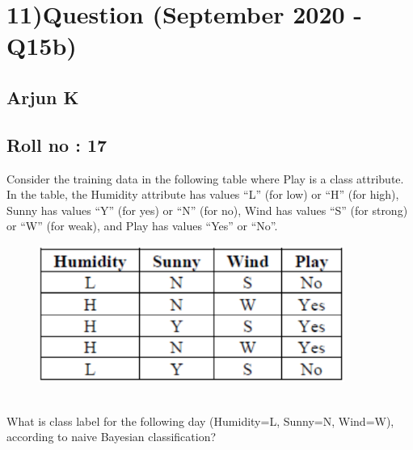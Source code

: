 \section*{11)Question (September 2020 - Q15b) }
    \subsection*{\large Arjun K}
    \subsection*{Roll no : 17}
Consider the training data in the following table where Play is a class attribute. In the table, the Humidity attribute has values “L” (for low) or “H” (for high), Sunny has values “Y” (for yes) or “N” (for no), Wind has values “S” (for strong) or “W” (for weak), and Play has values “Yes” or “No”.
\begin{figure}[htp]
    \centering
    \includegraphics[width=10cm]{images/A11_img1.png}
\end{figure}\\
What is class label for the following day (Humidity=L, Sunny=N,
Wind=W), according to naive Bayesian classification?\\

